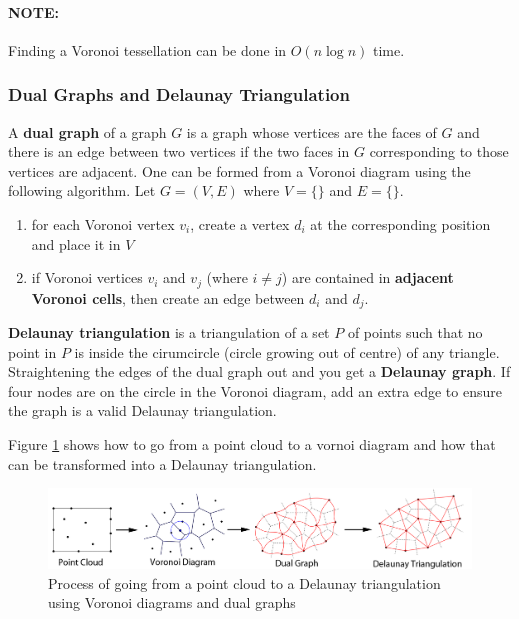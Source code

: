 \documentclass{article}
\begin{document}
\paragraph{\textbf{NOTE:}} Finding a Voronoi tessellation can be done in $O(n \log n)$ time.

\subsubsection{Dual Graphs and Delaunay Triangulation}

A \textbf{dual graph} of a graph $G$ is a graph whose vertices are the faces of $G$ and there is an edge between two vertices if the two faces in $G$ corresponding to those vertices are adjacent. One can be formed from a Voronoi diagram using the following algorithm.
Let $G = (V, E)$ where $V = \lbrace \rbrace$ and $E = \lbrace \rbrace$.
\begin{enumerate}
	\item for each Voronoi vertex $v_i$, create a vertex $d_i$ at the corresponding position and place it in $V$
	\item if Voronoi vertices $v_i$ and $v_j$ (where $i \neq j$) are contained in \textbf{adjacent Voronoi cells}, then create an edge between $d_i$ and $d_j$.
\end{enumerate}

\textbf{Delaunay triangulation} is a triangulation of a set $P$ of points such that no point in $P$ is inside the cirumcircle (circle growing out of centre) of any triangle. Straightening the edges of the dual graph out and you get a \textbf{Delaunay graph}. If four nodes are on the  circle in the Voronoi diagram, add an extra edge to ensure the graph is a valid Delaunay triangulation.

Figure \ref{fig:vornoi-dual-delaunay} shows how to go from a point cloud to a vornoi diagram and how that can be transformed into a Delaunay triangulation.

\begin{figure}
	\centering
	\includegraphics[scale=0.35]{figures/mesh-triangulation-process.png}
	\caption{Process of going from a point cloud to a Delaunay triangulation using Voronoi diagrams and dual graphs}
	\label{fig:vornoi-dual-delaunay}
\end{figure}
\end{document}
